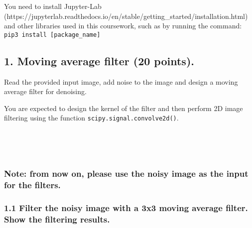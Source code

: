 \documentclass[11pt]{article}
\begin{document}
You need to install Jupyter-Lab
(https://jupyterlab.readthedocs.io/en/stable/getting\_started/installation.html)
and other libraries used in this coursework, such as by running the
command: \texttt{pip3\ install\ {[}package\_name{]}}

    \hypertarget{moving-average-filter-20-points.}{%
\subsection{1. Moving average filter (20
points).}\label{moving-average-filter-20-points.}}

Read the provided input image, add noise to the image and design a
moving average filter for denoising.

You are expected to design the kernel of the filter and then perform 2D
image filtering using the function \texttt{scipy.signal.convolve2d()}.

    \begin{center}
    \end{center}
    { \hspace*{\fill} \\}
    
    \begin{center}
    \end{center}
    { \hspace*{\fill} \\}
    
    \hypertarget{note-from-now-on-please-use-the-noisy-image-as-the-input-for-the-filters.}{%
\subsubsection{Note: from now on, please use the noisy image as the
input for the
filters.}\label{note-from-now-on-please-use-the-noisy-image-as-the-input-for-the-filters.}}

\hypertarget{filter-the-noisy-image-with-a-3x3-moving-average-filter.-show-the-filtering-results.}{%
\subsubsection{1.1 Filter the noisy image with a 3x3 moving average
filter. Show the filtering
results.}\label{filter-the-noisy-image-with-a-3x3-moving-average-filter.-show-the-filtering-results.}}
\end{document}
